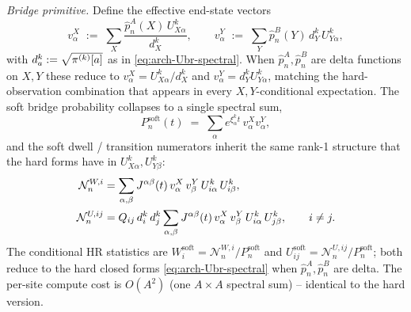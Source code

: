 \emph{Bridge primitive.} Define the effective end-state vectors
\begin{equation}
  v^X_\alpha \;:=\; \sum_X \frac{\hat p^{A}_n(X)\, U^{k}_{X\alpha}}{d^k_X},
  \qquad
  v^Y_\alpha \;:=\; \sum_Y \hat p^{B}_n(Y)\, d^k_Y\, U^{k}_{Y\alpha},
  \label{eq:arch-hr-soft-vXvY}
\end{equation}
with $d^k_a := \sqrt{\pi^{(k)}[a]}$ as in \eqref{eq:arch-Ubr-spectral}.
When $\hat p^{A}_n, \hat p^{B}_n$ are delta functions on $X, Y$ these reduce to
$v^X_\alpha = U^k_{X\alpha}/d^k_X$ and $v^Y_\alpha = d^k_Y U^k_{Y\alpha}$,
matching the hard-observation combination that appears in every
$X, Y$-conditional expectation. The soft bridge probability collapses
to a single spectral sum,
\begin{equation}
  P^{\mathrm{soft}}_n(t) \;=\; \sum_\alpha e^{\xi^k_\alpha t}\,
    v^X_\alpha v^Y_\alpha,
  \label{eq:arch-hr-soft-P}
\end{equation}
and the soft dwell / transition numerators inherit the same rank-1
structure that the hard forms have in $U^k_{X\alpha}, U^k_{Y\beta}$:
\begin{align}
  \mathcal{N}_n^{W, i}
    &= \sum_{\alpha, \beta} J^{\alpha\beta}(t)\,
       v^X_\alpha\, v^Y_\beta\, U^k_{i\alpha}\, U^k_{i\beta},
  \label{eq:arch-hr-soft-Wnumer} \\
  \mathcal{N}_n^{U, ij}
    &= Q_{ij}\, d^k_i\, d^k_j
       \sum_{\alpha, \beta} J^{\alpha\beta}(t)\,
       v^X_\alpha\, v^Y_\beta\, U^k_{i\alpha}\, U^k_{j\beta},
  \qquad i \ne j.
  \label{eq:arch-hr-soft-Unumer}
\end{align}
The conditional HR statistics are $W_i^{\mathrm{soft}} = \mathcal{N}_n^{W, i} /
P^{\mathrm{soft}}_n$ and $U_{ij}^{\mathrm{soft}} = \mathcal{N}_n^{U, ij} /
P^{\mathrm{soft}}_n$; both reduce to the hard closed forms
\eqref{eq:arch-Ubr-spectral} when $\hat p^{A}_n, \hat p^{B}_n$ are delta.
The per-site compute cost is $O(A^2)$ (one $A \times A$ spectral sum) --
identical to the hard version.


